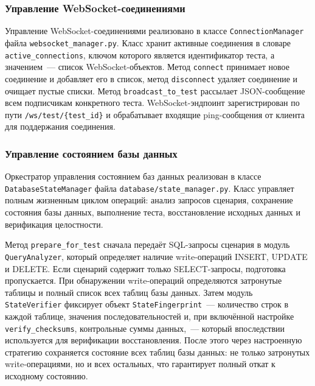 \subsubsection{Управление WebSocket-соединениями}

Управление WebSocket-соединениями реализовано в классе \texttt{ConnectionManager} файла \texttt{websocket\_manager.py}. Класс хранит активные соединения в словаре \texttt{active\_connections}, ключом которого является идентификатор теста, а значением~--- список WebSocket-объектов. Метод \texttt{connect} принимает новое соединение и добавляет его в список, метод \texttt{disconnect} удаляет соединение и очищает пустые списки. Метод \texttt{broadcast\_to\_test} рассылает JSON-сообщение всем подписчикам конкретного теста. WebSocket-эндпоинт зарегистрирован по пути \texttt{/ws/test/\{test\_id\}} и обрабатывает входящие ping-сообщения от клиента для поддержания соединения.

\subsubsection{Управление состоянием базы данных}

Оркестратор управления состоянием баз данных реализован в классе \texttt{DatabaseStateManager} файла \texttt{database/state\_manager.py}. Класс управляет полным жизненным циклом операций: анализ запросов сценария, сохранение состояния базы данных, выполнение теста, восстановление исходных данных и верификация целостности.

Метод \texttt{prepare\_for\_test} сначала передаёт SQL-запросы сценария в модуль \texttt{QueryAnalyzer}, который определяет наличие write-операций INSERT, UPDATE и DELETE. Если сценарий содержит только SELECT-запросы, подготовка пропускается. При обнаружении write-операций определяются затронутые таблицы и полный список всех таблиц базы данных. Затем модуль \texttt{StateVerifier} фиксирует объект \texttt{StateFingerprint}~--- количество строк в каждой таблице, значения последовательностей и, при включённой настройке \texttt{verify\_checksums}, контрольные суммы данных,~--- который впоследствии используется для верификации восстановления. После этого через настроенную стратегию сохраняется состояние всех таблиц базы данных: не только затронутых write-операциями, но и всех остальных, что гарантирует полный откат к исходному состоянию.

